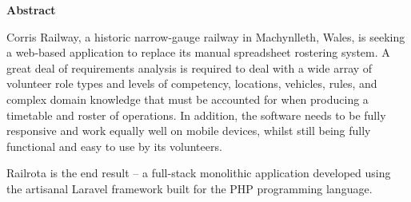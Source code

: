 \thispagestyle{empty}


\begin{center}
    {\LARGE\bf Abstract}
\end{center}

Corris Railway, a historic narrow-gauge railway in Machynlleth, Wales, is seeking a web-based application to replace its manual spreadsheet rostering system. A great deal of requirements analysis is required to deal with a wide array of volunteer role types and levels of competency, locations, vehicles, rules, and complex domain knowledge that must be accounted for when producing a timetable and roster of operations. In addition, the software needs to be fully responsive and work equally well on mobile devices, whilst still being fully functional and easy to use by its volunteers.

Railrota is the end result – a full-stack monolithic application developed using the artisanal Laravel framework built for the PHP programming language.

